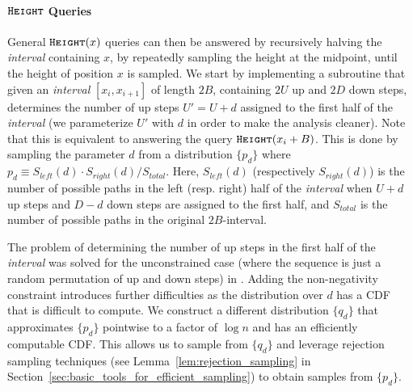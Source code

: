 \paragraph*{$\texttt{\textsc{Height}}$ Queries}
\label{par:height_queries}
General $\texttt{\textsc{Height}}(x)$ queries can then be answered by recursively halving the \emph{interval} containing $x$,
by repeatedly sampling the height at the midpoint, until the height of position $x$ is sampled.
We start by implementing a subroutine that given an \emph{interval} $[x_i,x_{i+1}]$ of length $2B$, containing $2U$ up and $2D$ down steps,
determines the number of up steps $U'=U+d$ assigned to the first half of the \emph{interval}
(we parameterize $U'$ with $d$ in order to make the analysis cleaner).
Note that this is equivalent to answering the query $\texttt{\textsc{Height}}(x_i+B)$.
This is done by sampling the parameter $d$ from a distribution $\{ p_d\}$ where $p_d \equiv S_{left}(d)\cdot S_{right}(d)/S_{total}$.
Here, $S_{left}(d)$ (respectively $S_{right}(d)$) is the number of possible paths in the left (resp. right) half of the \emph{interval} when
$U+d$ up steps and $D-d$ down steps are assigned to the first half, and $S_{total}$ is the number of possible paths in the original $2B$-interval.

The problem of determining the number of up steps in the first half of the \emph{interval} was solved for the unconstrained case
(where the sequence is just a random permutation of up and down steps) in \cite{huge}.
Adding the non-negativity constraint introduces further difficulties as the distribution over $d$ has a CDF that is difficult to compute.
We construct a different distribution $\{q_d\}$ that approximates $\{p_d\}$ pointwise to a factor of $\log n$ and has an efficiently computable CDF.
This allows us to sample from $\{q_d\}$ and leverage rejection sampling techniques
(see Lemma~\ref{lem:rejection_sampling} in Section~\ref{sec:basic_tools_for_efficient_sampling}) to obtain samples from $\{p_d\}$.

